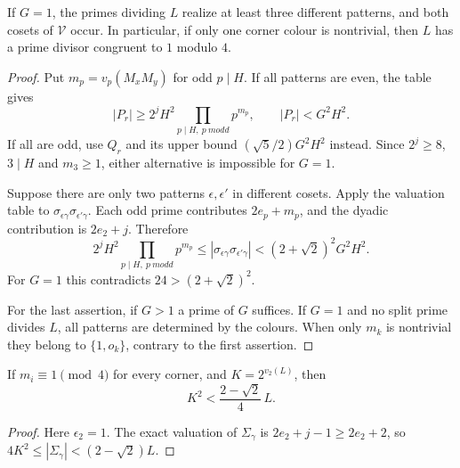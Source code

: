 \begin{corollary}
\label{cor:pat-three-patterns}
If $G=1$, the primes dividing $L$ realize at least three different
patterns, and both cosets of $\mathcal V$ occur.  In particular,
if only one corner colour is nontrivial, then $L$ has a prime
divisor congruent to $1$ modulo $4$.
\end{corollary}

\begin{proof}
Put $m_p=v_p(M_xM_y)$ for odd $p\mid H$.
If all patterns are even, the table gives
\[
 |P_r|\geq 2^jH^2\prod_{p\mid H,\ p\ {
m odd}}p^{m_p},
 \qquad |P_r|<G^2H^2.
\]
If all are odd, use $Q_r$ and its upper bound
$(\sqrt5/2)G^2H^2$ instead.  Since $2^j\geq8$, $3\mid H$
and $m_3\geq1$, either alternative is impossible for $G=1$.

Suppose there are only two patterns $\epsilon,\epsilon'$ in
different cosets.  Apply the valuation table to
$\sigma_{\epsilon\gamma}\sigma_{\epsilon'\gamma}$.
Each odd prime contributes $2e_p+m_p$, and the dyadic contribution
is $2e_2+j$.  Therefore
\[
 2^jH^2\prod_{p\mid H,\ p\ {
m odd}}p^{m_p}
 \leq|\sigma_{\epsilon\gamma}\sigma_{\epsilon'\gamma}|
 <(2+\sqrt2)^2G^2H^2.
\]
For $G=1$ this contradicts $24>(2+\sqrt2)^2$.

For the last assertion, if $G>1$ a prime of $G$ suffices.
If $G=1$ and no split prime divides $L$, all patterns are
determined by the colours.  When only $m_k$ is nontrivial they
belong to $\{1,o_k\}$, contrary to the first assertion.
\end{proof}

\begin{corollary}
\label{cor:pat-dyadic-bound}
If $m_i\equiv1\pmod4$ for every corner, and
$K=2^{v_2(L)}$, then
\[
 K^2<\frac{2-\sqrt2}{4}\,L.
\]
\end{corollary}

\begin{proof}
Here $\epsilon_2=1$.  The exact valuation of $\Sigma_\gamma$
is $2e_2+j-1\geq2e_2+2$, so
$4K^2\leq|\Sigma_\gamma|<(2-\sqrt2)L$.
\end{proof}
